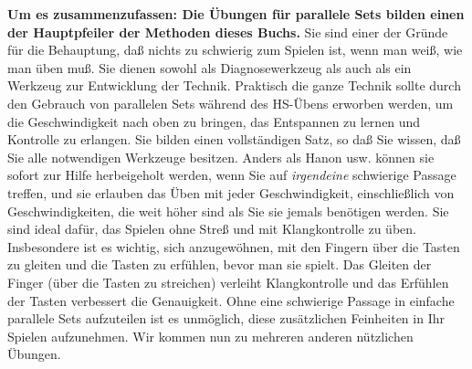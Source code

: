 \textbf{Um es zusammenzufassen: Die Übungen für parallele Sets bilden einen der Hauptpfeiler der Methoden dieses Buchs.}
Sie sind einer der Gründe für die Behauptung, daß nichts zu schwierig zum Spielen ist, wenn man weiß, wie man üben muß.
Sie dienen sowohl als Diagnosewerkzeug als auch als ein Werkzeug zur Entwicklung der Technik.
Praktisch die ganze Technik sollte durch den Gebrauch von parallelen Sets während des HS-Übens erworben werden, um die Geschwindigkeit nach oben zu bringen, das Entspannen zu lernen und Kontrolle zu erlangen.
Sie bilden einen vollständigen Satz, so daß Sie wissen, daß Sie alle notwendigen Werkzeuge besitzen.
Anders als Hanon usw. können sie sofort zur Hilfe herbeigeholt werden, wenn Sie auf \textit{irgendeine} schwierige Passage treffen, und sie erlauben das Üben mit jeder Geschwindigkeit, einschließlich von Geschwindigkeiten, die weit höher sind als Sie sie jemals benötigen werden.
Sie sind ideal dafür, das Spielen ohne Streß und mit Klangkontrolle zu üben.
Insbesondere ist es wichtig, sich anzugewöhnen, mit den Fingern über die Tasten zu gleiten und die Tasten zu erfühlen, bevor man sie spielt.
Das Gleiten der Finger (über die Tasten zu streichen) verleiht Klangkontrolle und das Erfühlen der Tasten verbessert die Genauigkeit.
Ohne eine schwierige Passage in einfache parallele Sets aufzuteilen ist es unmöglich, diese zusätzlichen Feinheiten in Ihr Spielen aufzunehmen.
Wir kommen nun zu mehreren anderen nützlichen Übungen.



